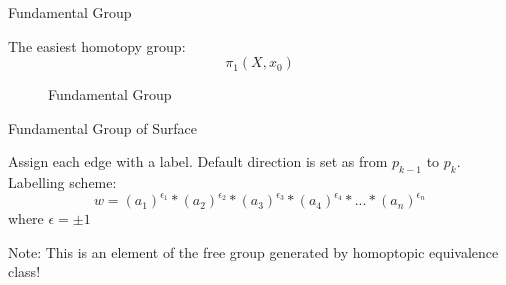 \documentclass[aspectratio=169]{beamer}
\begin{document}
\begin{frame}{Fundamental Group}
 \begin{bee}[] 
        The easiest homotopy group: \\
        $$\pi_1(X,x_0)$$
    \end{bee} 

\begin{figure}
\caption{Fundamental Group}
    \label{fig:my_label}
\end{figure}


\end{frame}
\begin{frame}{Fundamental Group of Surface}
 \begin{bee}
Assign each edge with a label. Default direction is set as from $p_{k-1}$ to $p_{k}$.\\
Labelling scheme:
$$w = (a_1)^{\epsilon_1} \ast       (a_2)^{\epsilon_2} \ast    (a_3)^{\epsilon_3} \ast (a_4)^{\epsilon_4} \ast...        \ast(a_n)^{\epsilon_n} $$
where $\epsilon = \pm 1$    
    \end{bee} 
Note: This is an element of the free group generated by homoptopic equivalence class!
\end{frame}
\end{document}
